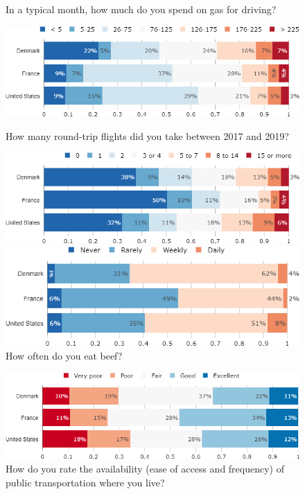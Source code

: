 \documentclass[aspectratio=169,9pt,dvipsnames]{beamer}
\begin{document}
\begin{frame}{}%
\begin{figure}[h!]
\centering
\caption{In a typical month, how much do you spend on gas for driving?}
\includegraphics[width=.6\textwidth]{../figures/country_comparison/gas_expenses_countries.png} \\
\vspace{.5cm}
\caption{How many round-trip flights did you take between 2017 and 2019?}
\includegraphics[width=.7\textwidth]{../figures/country_comparison/flights_3y_countries.png}
\vspace{.5cm}
\caption{How often do you eat beef?}
\includegraphics[width=.7\textwidth]{../figures/country_comparison/frequency_beef_countries.png}
\end{figure}
\end{frame}

\begin{frame}{}%
\begin{figure}[h!]
\centering
\caption{How do you rate the availability (ease of access and frequency) of public transportation where you live?}
\includegraphics[width=.9\textwidth]{../figures/country_comparison/availability_transport_countries.png}
\end{figure}
\end{frame}
\end{document}
